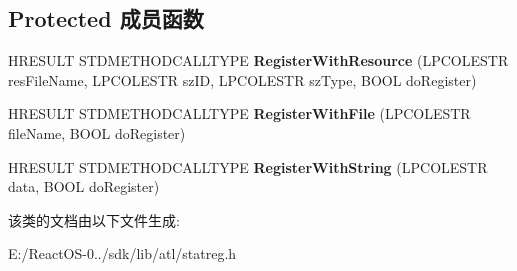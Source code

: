\subsection*{Protected 成员函数}
\begin{DoxyCompactItemize}
\item 
\mbox{\label{class_a_t_l_1_1_c_reg_object_abac82cc7978be8b11bc1692aad6c3845}} 
H\+R\+E\+S\+U\+LT S\+T\+D\+M\+E\+T\+H\+O\+D\+C\+A\+L\+L\+T\+Y\+PE {\bfseries Register\+With\+Resource} (L\+P\+C\+O\+L\+E\+S\+TR res\+File\+Name, L\+P\+C\+O\+L\+E\+S\+TR sz\+ID, L\+P\+C\+O\+L\+E\+S\+TR sz\+Type, B\+O\+OL do\+Register)
\item 
\mbox{\label{class_a_t_l_1_1_c_reg_object_a8de63e1c4a586e82d1adadcb85eef764}} 
H\+R\+E\+S\+U\+LT S\+T\+D\+M\+E\+T\+H\+O\+D\+C\+A\+L\+L\+T\+Y\+PE {\bfseries Register\+With\+File} (L\+P\+C\+O\+L\+E\+S\+TR file\+Name, B\+O\+OL do\+Register)
\item 
\mbox{\label{class_a_t_l_1_1_c_reg_object_af7c603ee7a0c42bdb87244394d9e0c08}} 
H\+R\+E\+S\+U\+LT S\+T\+D\+M\+E\+T\+H\+O\+D\+C\+A\+L\+L\+T\+Y\+PE {\bfseries Register\+With\+String} (L\+P\+C\+O\+L\+E\+S\+TR data, B\+O\+OL do\+Register)
\end{DoxyCompactItemize}


该类的文档由以下文件生成\+:\begin{DoxyCompactItemize}
\item 
E\+:/\+React\+O\+S-\/0../sdk/lib/atl/statreg.\+h\end{DoxyCompactItemize}
